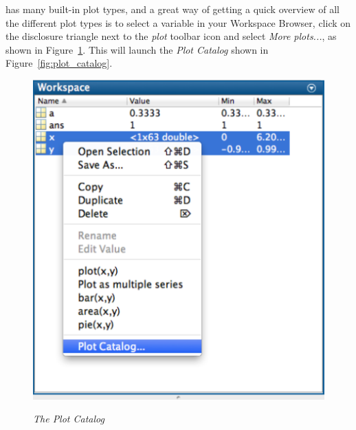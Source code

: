\mlab has many built-in plot types, and a great way of getting a quick overview of all the different plot types is to select a variable in your Workspace Browser, click on the disclosure triangle next to the \textit{plot} toolbar icon and select \textit{More plots...}, as shown in Figure~\ref{fig:access_plot_catalog}. This will launch the \textit{Plot Catalog} shown in Figure~\ref{fig:plot_catalog}.
\begin{figure}[h]
	\myfloatalign
    {\includegraphics[width=0.45\linewidth]{Graphics/Unit02/access_plot_catalog}\label{fig:access_plot_catalog}} \\
    \caption{\textit{The Plot Catalog}}
\end{figure}

